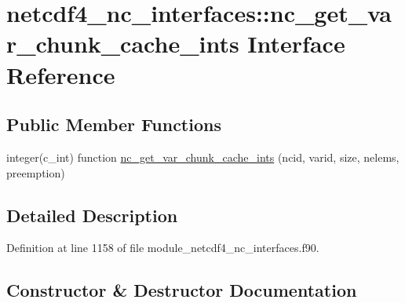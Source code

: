 \hypertarget{interfacenetcdf4__nc__interfaces_1_1nc__get__var__chunk__cache__ints}{}\section{netcdf4\+\_\+nc\+\_\+interfaces\+:\+:nc\+\_\+get\+\_\+var\+\_\+chunk\+\_\+cache\+\_\+ints Interface Reference}
\label{interfacenetcdf4__nc__interfaces_1_1nc__get__var__chunk__cache__ints}
\subsection*{Public Member Functions}
\begin{DoxyCompactItemize}
\item 
integer(c\+\_\+int) function \hyperlink{interfacenetcdf4__nc__interfaces_1_1nc__get__var__chunk__cache__ints_a1df693e8f565e80984ce25a7ce7c22ae}{nc\+\_\+get\+\_\+var\+\_\+chunk\+\_\+cache\+\_\+ints} (ncid, varid, size, nelems, preemption)
\end{DoxyCompactItemize}


\subsection{Detailed Description}


Definition at line 1158 of file module\+\_\+netcdf4\+\_\+nc\+\_\+interfaces.\+f90.



\subsection{Constructor \& Destructor Documentation}
\mbox{\label{interfacenetcdf4__nc__interfaces_1_1nc__get__var__chunk__cache__ints_a1df693e8f565e80984ce25a7ce7c22ae}} 

